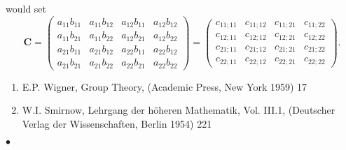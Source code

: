 would set
$$\mathbf{C}=\left( \begin{array}{llll}
a_{11}b_{11}& a_{11}b_{12}& a_{12}b_{11}& a_{12}b_{12}  \\
a_{11}b_{21}& a_{11}b_{22}& a_{12}b_{21}& a_{12}b_{22}  \\
a_{21}b_{11}& a_{21}b_{12}& a_{22}b_{11}& a_{22}b_{12}  \\
a_{21}b_{21}& a_{21}b_{22}& a_{22}b_{21}& a_{22}b_{22}
 \end{array}\right) =
\left( \begin{array}{llll}
c_{11;11}& c_{11;12}& c_{11;21}& c_{11;22}  \\
c_{12;11}& c_{12;12}& c_{12;21}& c_{12;22}  \\
c_{21;11}& c_{21;12}& c_{21;21}& c_{21;22}  \\
c_{22;11}& c_{22;12}& c_{22;21}& c_{22;22}
\end{array}  \right ).$$
\newpage
\Refer
\begin{enumerate}
\item E.P. Wigner, Group Theory, (Academic Press, New York 1959) 17
\item W.I. Smirnow, Lehrgang der h\"oheren Mathematik, Vol. III.1,
(Deutscher Verlag der Wissenschaften, Berlin 1954) 221
\end{enumerate}
$\bullet$
